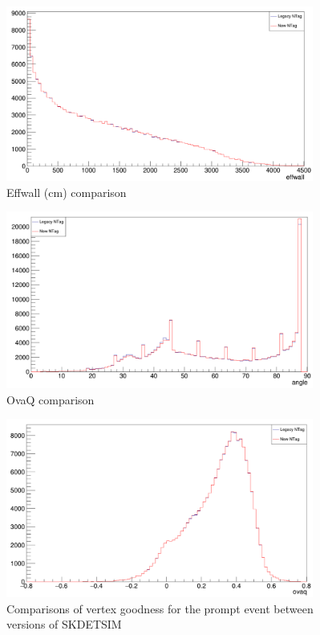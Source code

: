 \begin{figure}
    \centering
    \includegraphics[width=0.9\textwidth]{Figures/effwall_recon_compare.PNG}
    \caption{Effwall (cm) comparison}
    \label{fig:effwall_recon_compare}

\end{figure}

\begin{figure}
    \centering
    \includegraphics[width=0.9\textwidth]{Figures/angle_recon_compare.PNG}
    \caption{OvaQ comparison}
    \label{fig:angle_recon_compare}

\end{figure}

\begin{figure}
    \centering
    \includegraphics[width=0.9\textwidth]{Figures/ovaq_recon_compare.PNG}
    \caption{Comparisons of vertex goodness for the prompt event between versions of SKDETSIM}
    \label{fig:ovaq_recon_compare}

\end{figure}

